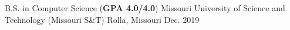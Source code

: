 

\begin{cventries}

  \cventry
    {B.S. in Computer Science (\textbf{GPA 4.0/4.0})} %
    {Missouri University of Science and Technology (Missouri S\&T)} %
    {Rolla, Missouri} %
    {Dec. 2019} %
    {}

\end{cventries}

